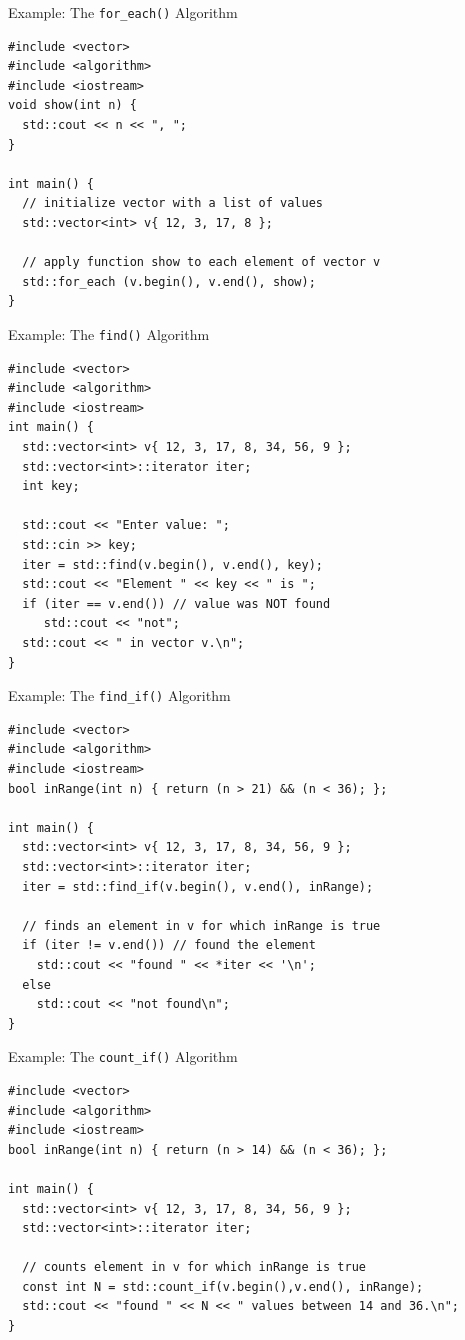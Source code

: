 \documentclass[14pt,aspectratio=1610]{beamer}
\begin{document}
\begin{frame}[fragile]{Example: The \texttt{for\_each()} Algorithm}
  \small
\begin{lstlisting}
#include <vector>
#include <algorithm>
#include <iostream>
void show(int n) {
  std::cout << n << ", ";
}

int main() {
  // initialize vector with a list of values
  std::vector<int> v{ 12, 3, 17, 8 };

  // apply function show to each element of vector v
  std::for_each (v.begin(), v.end(), show);
}
\end{lstlisting}
\end{frame}

\begin{frame}[fragile]{Example: The \texttt{find()} Algorithm}
  
\begin{lstlisting}[basicstyle=\small\ttfamily]
#include <vector>
#include <algorithm>
#include <iostream>
int main() {
  std::vector<int> v{ 12, 3, 17, 8, 34, 56, 9 };
  std::vector<int>::iterator iter;
  int key;

  std::cout << "Enter value: ";
  std::cin >> key;
  iter = std::find(v.begin(), v.end(), key);
  std::cout << "Element " << key << " is ";
  if (iter == v.end()) // value was NOT found
     std::cout << "not";
  std::cout << " in vector v.\n";
}
\end{lstlisting}
\end{frame}

\begin{frame}[fragile]{Example: The \texttt{find\_if()} Algorithm}
\begin{lstlisting}[basicstyle=\small\ttfamily]
#include <vector>
#include <algorithm>
#include <iostream>
bool inRange(int n) { return (n > 21) && (n < 36); };

int main() {
  std::vector<int> v{ 12, 3, 17, 8, 34, 56, 9 };
  std::vector<int>::iterator iter;
  iter = std::find_if(v.begin(), v.end(), inRange);

  // finds an element in v for which inRange is true
  if (iter != v.end()) // found the element
    std::cout << "found " << *iter << '\n';
  else
    std::cout << "not found\n";
}
\end{lstlisting}
\end{frame}

\begin{frame}[fragile]{Example: The \texttt{count\_if()} Algorithm}
\begin{lstlisting}[basicstyle=\small\ttfamily]
#include <vector>
#include <algorithm>
#include <iostream>
bool inRange(int n) { return (n > 14) && (n < 36); };

int main() {
  std::vector<int> v{ 12, 3, 17, 8, 34, 56, 9 };
  std::vector<int>::iterator iter;

  // counts element in v for which inRange is true
  const int N = std::count_if(v.begin(),v.end(), inRange);
  std::cout << "found " << N << " values between 14 and 36.\n";
}
\end{lstlisting}
\end{frame}
\end{document}

